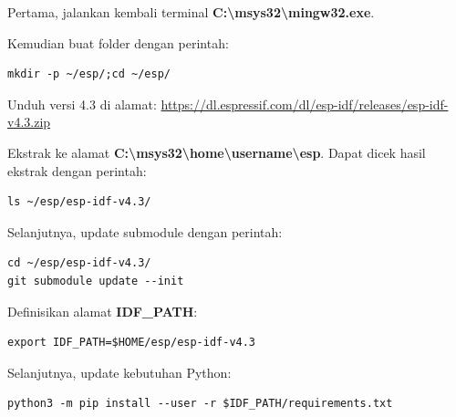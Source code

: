 \documentclass[12pt]{book}
\begin{document}
	Pertama, jalankan kembali terminal \textbf{C:\textbackslash msys32\textbackslash mingw32.exe}.
	
	Kemudian buat folder dengan perintah:
	
	\begin{verbatim}
mkdir -p ~/esp/;cd ~/esp/
	\end{verbatim}
	
	Unduh versi 4.3 di alamat: \url{https://dl.espressif.com/dl/esp-idf/releases/esp-idf-v4.3.zip}
	
	Ekstrak ke alamat \textbf{C:\textbackslash msys32\textbackslash home\textbackslash username\textbackslash esp}.
	Dapat dicek hasil ekstrak dengan perintah:
	
	\begin{verbatim}
ls ~/esp/esp-idf-v4.3/
	\end{verbatim}
	
	Selanjutnya, update submodule dengan perintah:
	
	\begin{verbatim}
cd ~/esp/esp-idf-v4.3/
git submodule update --init
	\end{verbatim}
	
	Definisikan alamat \textbf{IDF\_PATH}:
	
	\begin{verbatim}
export IDF_PATH=$HOME/esp/esp-idf-v4.3
	\end{verbatim}
	
	Selanjutnya, update kebutuhan Python:
	
	\begin{verbatim}
python3 -m pip install --user -r $IDF_PATH/requirements.txt
	\end{verbatim}
	
	
\end{document}
